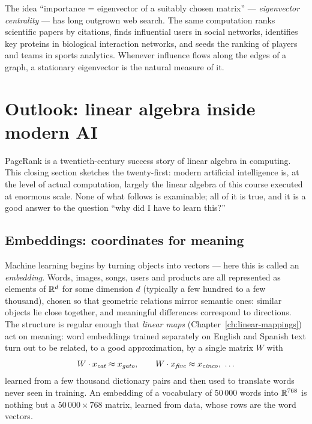 \begin{remark}
The idea ``importance = eigenvector of a suitably chosen matrix'' — \emph{eigenvector centrality} — has
long outgrown web search. The same computation ranks scientific papers by citations, finds influential
users in social networks, identifies key proteins in biological interaction networks, and seeds the
ranking of players and teams in sports analytics. Whenever influence flows along the edges of a graph, a
stationary eigenvector is the natural measure of it.
\end{remark}

\section{Outlook: linear algebra inside modern AI}\label{sec:ai}

PageRank is a twentieth-century success story of linear algebra in computing. This closing section
sketches the twenty-first: modern artificial intelligence is, at the level of actual computation, largely
the linear algebra of this course executed at enormous scale. None of what follows is examinable; all of
it is true, and it is a good answer to the question ``why did I have to learn this?''

\subsection{Embeddings: coordinates for meaning}

Machine learning begins by turning objects into vectors — here this is called an \emph{embedding}. Words,
images, songs, users and products are all represented as elements of $\mathbb{R}^d$ for some dimension $d$
(typically a few hundred to a few thousand), chosen so that geometric relations mirror semantic ones:
similar objects lie close together, and meaningful differences correspond to directions. The structure
is regular enough that \emph{linear maps} (Chapter~\ref{ch:linear-mappings}) act on meaning: word embeddings
trained separately on English and Spanish text turn out to be related, to a good approximation, by a
single matrix $W$ with
\[
W\cdot x_{\text{\itshape cat}} \approx x_{\text{\itshape gato}},\qquad
W\cdot x_{\text{\itshape five}} \approx x_{\text{\itshape cinco}},\ \ldots
\]
learned from a few thousand dictionary pairs and then used to translate words never seen in training.
An embedding of a vocabulary of $50\,000$ words into
$\mathbb{R}^{768}$ is nothing but a $50\,000\times 768$ matrix, learned from data, whose rows are the word
vectors.

